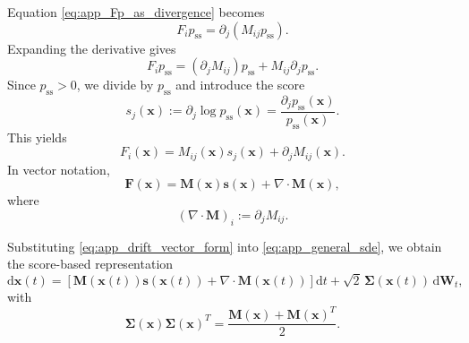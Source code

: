 \documentclass[11pt,twoside,fleqn]{article}
\renewcommand{\d}{\mathrm{d}}
\begin{document}
Equation \eqref{eq:app_Fp_as_divergence} becomes
\begin{equation}
    F_i p_{\mathrm{ss}}
    =
    \partial_j(M_{ij}p_{\mathrm{ss}}).
    \label{eq:app_Fp_M}
\end{equation}
Expanding the derivative gives
\begin{equation}
    F_i p_{\mathrm{ss}}
    =
    (\partial_j M_{ij})p_{\mathrm{ss}}
    +
    M_{ij}\partial_j p_{\mathrm{ss}}.
    \label{eq:app_expand_derivative}
\end{equation}
Since $p_{\mathrm{ss}}>0$, we divide by $p_{\mathrm{ss}}$ and introduce the score
\begin{equation}
    s_j(\bm{x})
    :=
    \partial_j\log p_{\mathrm{ss}}(\bm{x})
    =
    \frac{\partial_j p_{\mathrm{ss}}(\bm{x})}{p_{\mathrm{ss}}(\bm{x})}.
    \label{eq:app_score_definition}
\end{equation}
This yields
\begin{equation}
    F_i(\bm{x})
    =
    M_{ij}(\bm{x})s_j(\bm{x})
    +
    \partial_j M_{ij}(\bm{x}).
    \label{eq:app_drift_component_form}
\end{equation}
In vector notation,
\begin{equation}
    \bm{F}(\bm{x})
    =
    \bm{M}(\bm{x})\bm{s}(\bm{x})
    +
    \nabla\cdot\bm{M}(\bm{x}),
    \label{eq:app_drift_vector_form}
\end{equation}
where
\begin{equation}
    (\nabla\cdot\bm{M})_i
    :=
    \partial_j M_{ij}.
    \label{eq:app_divergence_convention}
\end{equation}

Substituting \eqref{eq:app_drift_vector_form} into \eqref{eq:app_general_sde}, we obtain the score-based representation
\begin{equation}
    \d \bm{x}(t)
    =
    \left[
        \bm{M}(\bm{x}(t))\bm{s}(\bm{x}(t))
        +
        \nabla\cdot\bm{M}(\bm{x}(t))
    \right]\d t
    +
    \sqrt{2}\,\bm{\Sigma}(\bm{x}(t))\,\d \bm{W}_t,
    \label{eq:app_score_based_sde}
\end{equation}
with
\begin{equation}
    \bm{\Sigma}(\bm{x})\bm{\Sigma}(\bm{x})^T
    =
    \frac{\bm{M}(\bm{x})+\bm{M}(\bm{x})^T}{2}.
    \label{eq:app_sigma_constraint}
\end{equation}
\end{document}
